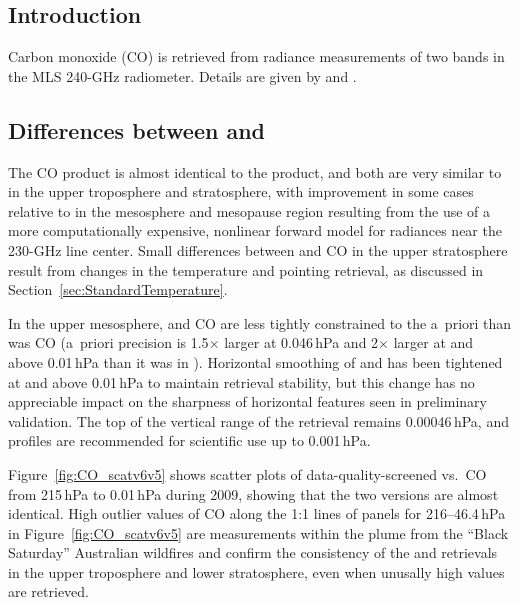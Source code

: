 
\subsection{Introduction}

Carbon monoxide (CO) is retrieved from radiance measurements of two bands in the MLS \mbox{240-GHz} radiometer. Details are given by \citet{PumphreyEtal:2007} and \citet{LiveseyEtal:2008}.

\subsection{Differences between \thisv and \prevv}
The \thisv CO product is almost identical to the \prevv product, and both are very similar to \viv in the upper troposphere and stratosphere, with improvement in some cases relative to \viv in the mesosphere and mesopause region resulting from the use of a more computationally expensive, nonlinear forward model for radiances near the 230\nobreakdash-GHz line center. Small differences between \thisv and \prevv CO in the upper stratosphere result from changes in the temperature and pointing retrieval, as discussed in Section~\ref{sec:StandardTemperature}. 

In the upper mesosphere, \thisv and \prevv CO are less tightly constrained to the a~priori than was \viv CO (a~priori precision is 1.5$\times$ larger at 0.046\,hPa and 2$\times$ larger at and above 0.01\,hPa than it was in \viv). Horizontal smoothing of \thisv and \prevv has been tightened at and above 0.01\,hPa to maintain retrieval stability, but this change has no appreciable impact on the sharpness of horizontal features seen in preliminary validation. The top of the vertical range of the retrieval remains 0.00046\,hPa, and profiles are recommended for scientific use up to 0.001\,hPa.

Figure~\ref{fig:CO_scatv6v5} shows scatter plots of data-quality-screened \prevv vs.\ \thisv CO from 215\,hPa to 0.01\,hPa during 2009, showing that the two versions are almost identical. 
High outlier values of CO along the 1:1 lines of panels for 216--46.4\,hPa in Figure~\ref{fig:CO_scatv6v5} are measurements within the plume from the ``Black Saturday'' Australian wildfires and confirm the consistency of the \thisv and \prevv retrievals in the upper troposphere and lower stratosphere, even when unusally high values are retrieved.

